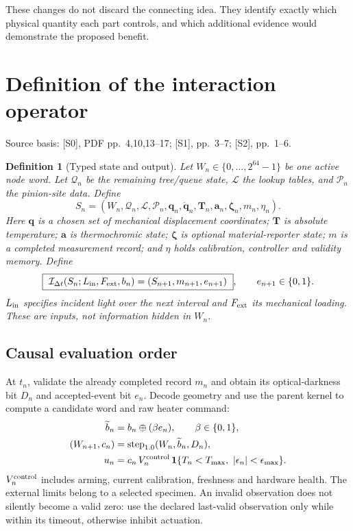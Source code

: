 \documentclass[10pt,a4paper]{article}
\numberwithin{equation}{section}
\newtheorem{definition}{Definition}[section]
\newcommand{\src}[1]{\textcolor{muted}{\footnotesize Source basis: #1.}}
\newcommand{\newpart}{\clearpage}
\newcommand{\bb}{\{0,1\}}
\newcommand{\opI}{\mathcal{I}}
\newcommand{\ind}{\mathbf{1}}
\begin{document}
\normalsize
These changes do not discard the connecting idea. They identify exactly which physical quantity each part controls, and which additional evidence would demonstrate the proposed benefit.

\newpart
\section{Definition of the interaction operator}
\label{sec:operator}
\src{[S0], PDF pp.~4,10,13--17; [S1], pp.~3--7; [S2], pp.~1--6}

\begin{definition}[Typed state and output]
Let $W_n\in\{0,\ldots,2^{64}-1\}$ be one active node word. Let $\mathcal Q_n$ be the remaining tree/queue state, $\mathcal L$ the lookup tables, and $\mathcal P_n$ the pinion-site data. Define
\begin{equation}
S_n=(W_n,\mathcal Q_n,\mathcal L,\mathcal P_n,\bm q_n,\dot{\bm q}_n,
\bm T_n,\bm a_n,\bm\zeta_n,m_n,\eta_n).
\end{equation}
Here $\bm q$ is a chosen set of mechanical displacement coordinates; $\bm T$ is absolute temperature; $\bm a$ is thermochromic state; $\bm\zeta$ is optional material-reporter state; $m$ is a completed measurement record; and $\eta$ holds calibration, controller and validity memory. Define
\begin{equation}
\boxed{\ \opI_{\Delta t}(S_n;L_{\rm in},F_{\rm ext},b_n)
       =(S_{n+1},m_{n+1},e_{n+1})\ },\qquad e_{n+1}\in\bb .
\label{eq:operator}
\end{equation}
$L_{\rm in}$ specifies incident light over the next interval and $F_{\rm ext}$ its mechanical loading. These are inputs, not information hidden in $W_n$.
\end{definition}

\subsection*{Causal evaluation order}
At $t_n$, validate the already completed record $m_n$ and obtain its optical-darkness bit $D_n$ and accepted-event bit $e_n$. Decode geometry and use the parent kernel to compute a candidate word and raw heater command:
\begin{align}
\widetilde b_n &= b_n\oplus(\beta e_n),\qquad \beta\in\bb,\\
(W_{n+1},c_n)&=\operatorname{step}_{1.0}(W_n,\widetilde b_n,D_n),\\
u_n&=c_n\,V_n^{\rm control}\,\ind\{T_n<T_{\max},\ |\epsilon_n|<\epsilon_{\max}\}.
\label{eq:command}
\end{align}
$V_n^{\rm control}$ includes arming, current calibration, freshness and hardware health. The external limits belong to a selected specimen. An invalid observation does not silently become a valid zero: use the declared last-valid observation only while within its timeout, otherwise inhibit actuation.
\end{document}
